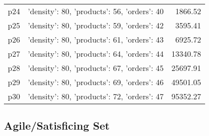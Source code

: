 \documentclass{article}
\begin{document}
\begin{center}
\begin{tabular}{@{}l|r|r@{}}
  p24&{'density': 80, 'products': 56, 'orders': 40}&1866.52\\
  p25&{'density': 80, 'products': 59, 'orders': 42}&3595.41\\
  p26&{'density': 80, 'products': 61, 'orders': 43}&6925.72\\
  p27&{'density': 80, 'products': 64, 'orders': 44}&13340.78\\
  p28&{'density': 80, 'products': 67, 'orders': 45}&25697.91\\
  p29&{'density': 80, 'products': 69, 'orders': 46}&49501.05\\
  p30&{'density': 80, 'products': 72, 'orders': 47}&95352.27
                            \end{tabular}
                            \end{center}
                    

                                \subsection*{Agile/Satisficing Set}
                                
\end{document}
